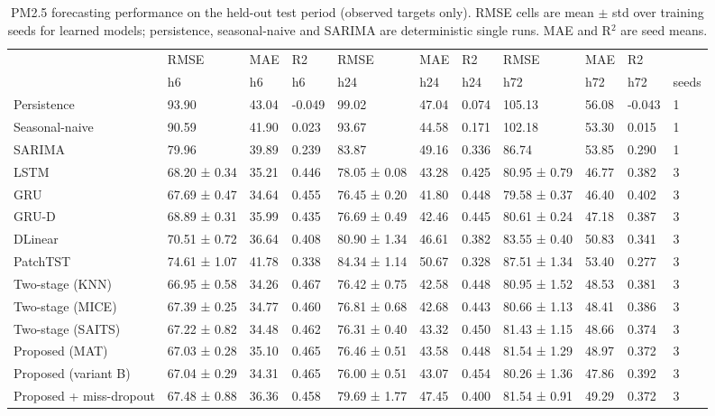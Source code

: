 \begin{table}
\caption{PM2.5 forecasting performance on the held-out test period (observed targets only). RMSE cells are mean $\pm$ std over training seeds for learned models; persistence, seasonal-naive and SARIMA are deterministic single runs. MAE and R$^2$ are seed means.}
\label{tab:main_results}
\begin{tabular}{lllllllllll}
\toprule
 & RMSE & MAE & R2 & RMSE & MAE & R2 & RMSE & MAE & R2 &  \\
 & h6 & h6 & h6 & h24 & h24 & h24 & h72 & h72 & h72 & seeds \\
\midrule
Persistence & 93.90 & 43.04 & -0.049 & 99.02 & 47.04 & 0.074 & 105.13 & 56.08 & -0.043 & 1 \\
Seasonal-naive & 90.59 & 41.90 & 0.023 & 93.67 & 44.58 & 0.171 & 102.18 & 53.30 & 0.015 & 1 \\
SARIMA & 79.96 & 39.89 & 0.239 & 83.87 & 49.16 & 0.336 & 86.74 & 53.85 & 0.290 & 1 \\
LSTM & 68.20 ± 0.34 & 35.21 & 0.446 & 78.05 ± 0.08 & 43.28 & 0.425 & 80.95 ± 0.79 & 46.77 & 0.382 & 3 \\
GRU & 67.69 ± 0.47 & 34.64 & 0.455 & 76.45 ± 0.20 & 41.80 & 0.448 & 79.58 ± 0.37 & 46.40 & 0.402 & 3 \\
GRU-D & 68.89 ± 0.31 & 35.99 & 0.435 & 76.69 ± 0.49 & 42.46 & 0.445 & 80.61 ± 0.24 & 47.18 & 0.387 & 3 \\
DLinear & 70.51 ± 0.72 & 36.64 & 0.408 & 80.90 ± 1.34 & 46.61 & 0.382 & 83.55 ± 0.40 & 50.83 & 0.341 & 3 \\
PatchTST & 74.61 ± 1.07 & 41.78 & 0.338 & 84.34 ± 1.14 & 50.67 & 0.328 & 87.51 ± 1.34 & 53.40 & 0.277 & 3 \\
Two-stage (KNN) & 66.95 ± 0.58 & 34.26 & 0.467 & 76.42 ± 0.75 & 42.58 & 0.448 & 80.95 ± 1.52 & 48.53 & 0.381 & 3 \\
Two-stage (MICE) & 67.39 ± 0.25 & 34.77 & 0.460 & 76.81 ± 0.68 & 42.68 & 0.443 & 80.66 ± 1.13 & 48.41 & 0.386 & 3 \\
Two-stage (SAITS) & 67.22 ± 0.82 & 34.48 & 0.462 & 76.31 ± 0.40 & 43.32 & 0.450 & 81.43 ± 1.15 & 48.66 & 0.374 & 3 \\
Proposed (MAT) & 67.03 ± 0.28 & 35.10 & 0.465 & 76.46 ± 0.51 & 43.58 & 0.448 & 81.54 ± 1.29 & 48.97 & 0.372 & 3 \\
Proposed (variant B) & 67.04 ± 0.29 & 34.31 & 0.465 & 76.00 ± 0.51 & 43.07 & 0.454 & 80.26 ± 1.36 & 47.86 & 0.392 & 3 \\
Proposed + miss-dropout & 67.48 ± 0.88 & 36.36 & 0.458 & 79.69 ± 1.77 & 47.45 & 0.400 & 81.54 ± 0.91 & 49.29 & 0.372 & 3 \\
\bottomrule
\end{tabular}
\end{table}
